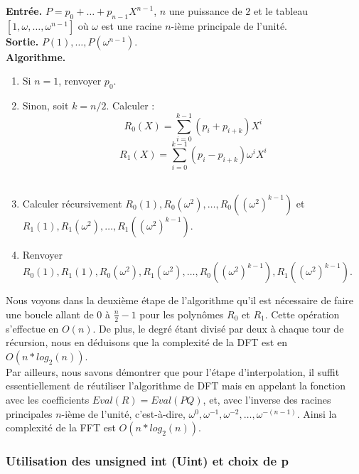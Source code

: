 \documentclass[12pt, a4paper]{article}
\begin{document}
\begin{tcolorbox}[colback=cyan!5!white,
                  colframe=cyan!100!black,
                  title=\textbf{Algorithme DFT}
                 ]
\textbf{Entrée.} $P = p_0+\dots+p_{n-1}X^{n-1}$, $n$ une puissance de $2$ et le tableau $[1, \omega,\dots,\omega^{n-1}]$ où $\omega$ est une racine $n$-ième principale de l'unité.\\
\textbf{Sortie.} $P(1),\dots,P(\omega^{n-1})$.\\
\textbf{Algorithme.}
\begin{enumerate}[itemsep=-2ex]
\item\textit{}Si $n=1$, renvoyer $p_0$. \\
\item\textit{}Sinon, soit $k=n/2$. Calculer : \\
\[ R_0(X) = \sum_{i=0}^{k-1}(p_i+p_{i+k})X^i \]
\[ R_1(X) = \sum_{i=0}^{k-1}(p_i-p_{i+k})\omega^iX^i \] \\
\item\textit{}Calculer récursivement $R_0(1), R_0(\omega^2),\dots,R_0((\omega^2)^{k-1})$ et \\ $R_1(1), R_1(\omega^2),\dots,R_1((\omega^2)^{k-1})$. \\
\item\textit{}Renvoyer $R_0(1), R_1(1), R_0(\omega^2), R_1(\omega^2),\dots, R_0((\omega^2)^{k-1}), R_1((\omega^2)^{k-1})$.
\end{enumerate}
\end{tcolorbox}

Nous voyons dans la deuxième étape de l'algorithme qu'il est nécessaire de faire une boucle allant de 0 à $\frac{n}{2}-1$ pour les polynômes $R_0$ et $R_1$. Cette opération s'effectue en $O(n)$. De plus, le degré étant divisé par deux à chaque tour de récursion, nous en déduisons que la complexité de la DFT est en $O(n*log_2(n))$. \\
\indent Par ailleurs, nous savons démontrer que pour l'étape d'interpolation, il suffit essentiellement de réutiliser l'algorithme de DFT mais en appelant la fonction avec les coefficients $Eval(R)=Eval(PQ)$, et, avec l'inverse des racines principales $n$-ième de l'unité, c'est-à-dire, $\omega^{0},\omega^{-1},\omega^{-2},\dots,\omega^{-(n-1)}$.
Ainsi la complexité de la FFT est $O(n*log_2(n))$.

\subsubsection{Utilisation des unsigned int (Uint) et choix de p}
\end{document}
